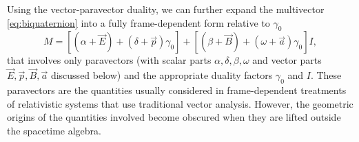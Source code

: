 \documentclass[1p,sort&compress]{elsarticle}
\numberwithin{equation}{section}
\newcommand{\rv}[1]{\vec{#1}}
\begin{document}
Using the vector-paravector duality, we can further expand the multivector \eqref{eq:biquaternion} into a fully frame-dependent form relative to $\gamma_0$
\begin{equation}\label{eq:relative}
  M = \left[(\alpha + \rv{E}) + (\delta + \rv{p})\gamma_0\right] + \left[(\beta + \rv{B}) + (\omega + \rv{a})\gamma_0\right]I,
\end{equation}
that involves only paravectors (with scalar parts $\alpha,\delta,\beta,\omega$ and vector parts $\rv{E},\rv{p},\rv{B},\rv{a}$ discussed below) and the appropriate duality factors $\gamma_0$ and $I$.  These paravectors are the quantities usually considered in frame-dependent treatments of relativistic systems that use traditional vector analysis.  However, the geometric origins of the quantities involved become obscured when they are lifted outside the spacetime algebra.  
\end{document}
